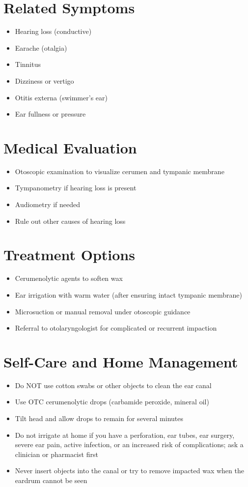 \section*{Related Symptoms}
\begin{itemize}
\item Hearing loss (conductive)
\item Earache (otalgia)
\item Tinnitus
\item Dizziness or vertigo
\item Otitis externa (swimmer's ear)
\item Ear fullness or pressure
\end{itemize}

\section*{Medical Evaluation}
\begin{itemize}
\item Otoscopic examination to visualize cerumen and tympanic membrane
\item Tympanometry if hearing loss is present
\item Audiometry if needed
\item Rule out other causes of hearing loss
\end{itemize}

\section*{Treatment Options}
\begin{itemize}
\item Cerumenolytic agents to soften wax
\item Ear irrigation with warm water (after ensuring intact tympanic membrane)
\item Microsuction or manual removal under otoscopic guidance
\item Referral to otolaryngologist for complicated or recurrent impaction
\end{itemize}
\section*{Self-Care and Home Management}
\begin{itemize}
\item Do NOT use cotton swabs or other objects to clean the ear canal
\item Use OTC cerumenolytic drops (carbamide peroxide, mineral oil)
\item Tilt head and allow drops to remain for several minutes
\item Do not irrigate at home if you have a perforation, ear tubes, ear surgery, severe ear pain, active infection, or an increased risk of complications; ask a clinician or pharmacist first
\item Never insert objects into the canal or try to remove impacted wax when the eardrum cannot be seen
\end{itemize}


